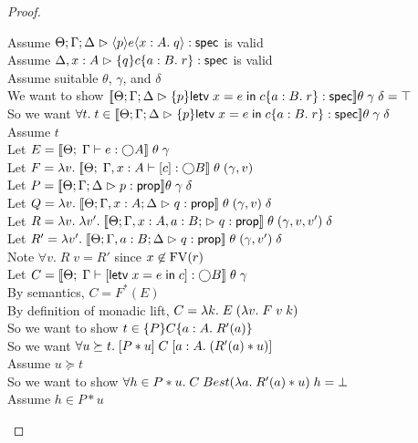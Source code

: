 \begin{proof}
  \begin{tabbedproof}
    \oo Assume $\judgeS{\mspec{p}{e}{x:A}{q}}$ is valid \\
    \oo Assume $\judgeS[\Delta,x:A]{\spec{q}{c}{a:B}{r}}$ is valid\\
    \ooo Assume suitable $\theta$, $\gamma$, and $\delta$ \\
    \oooo We want to show $\interp{\judgeS{\spec{p}{\letv{x}{e}{c}}{a:B}{r}}}\theta\;\gamma\;\delta = \top$\\
    \oooo So we want $\forall t.\; t \in \interp{\judgeS{\spec{p}{\letv{x}{e}{c}}{a:B}{r}}}\theta\;\gamma\;\delta$ \\
    \oooo Assume $t$ \\
    \ooooo Let $E = \interp{\judgeE{\Gamma}{e}{\monad{A}}}\;\theta\;\gamma$ \\
    \ooooo Let $F = \semfun{v}{\interp{\judgeE{\Gamma,x:A}{\comp{c}}{\monad{B}}}\;\theta\;(\gamma,v)}$ \\
    \ooooo Let $P = \interp{\judgeA{p}{\assert}}\theta\;\gamma\;\delta$ \\
    \ooooo Let $Q = \semfun{v}{\interp{\judgeA[\Theta; \Gamma ,x:A;\Delta]{q}{\assert}}\;\theta\;(\gamma,v)\;\delta}$ \\
    \ooooo Let $R = \semfun{v}{\semfun{v'}{\interp{\judgeA[\Theta;\Gamma,x:A,a:B;]{q}{\assert}}\;\theta\;(\gamma, v, v')\;\delta}}$ \\
    \ooooo Let $R' = \semfun{v'}{\interp{\judgeA[\Theta; \Gamma, a:B; \Delta]{q}{\assert}}\;\theta\;(\gamma, v')\;\delta}$ \\
    \ooooo Note $\forall v.\; R\;v = R'$ since $x \not\in \FV{r}$ \\
    \ooooo Let $C = \interp{\judgeE{\Gamma}{\comp{\letv{x}{e}{c}}}{\monad{B}}}\;\theta\;\gamma$ \\
    \ooooo By semantics, $C = F^*(E)$ \\
    \ooooo By definition of monadic lift, $C = \semfun{k}{E\;(\semfun{v}{F\;v\;k})}$ \\
    \ooooo So we want to show $t \in \spec{P}{C}{a:A}{R'(a)}$ \\
    \ooooo So we want $\forall u \succeq t.\; \basicspec{P * u}{C}{a:A}{(R'(a) * u)}$ \\
    \ooooo Assume $u \succeq t$ \\
    \oooooo So we want to show $\forall h \in P * u.\; C\;Best(\semfun{a}{R'(a) * u})\;h = \bot$\\
    \oooooo Assume $h \in P * u$ \\

\end{tabbedproof}
\end{proof}
